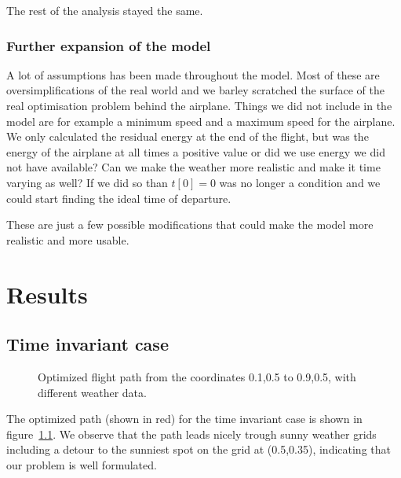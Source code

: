 \documentclass[ twoside,openright,titlepage,numbers=noenddot,headinclude,%
                footinclude=true,cleardoublepage=empty,abstractoff, %
                BCOR=5mm,paper=a4,fontsize=11pt,%
                ngerman,american,%
                ]{scrreprt}
\begin{document}
The rest of the analysis stayed the same.


\subsection{Further expansion of the model}

A lot of assumptions has been made throughout the model.
Most of these are oversimplifications of the real world and we barley scratched the surface of the real optimisation problem behind the airplane.
Things we did not include in the model are for example a minimum speed and a maximum speed for the airplane.
We only calculated the residual energy at the end of the flight, but was the energy of the airplane at all times a positive value or did we use energy we did not have available?
Can we make the weather more realistic and make it time varying as well? If we did so than $ t[0] =0 $ was no longer a condition and we could start finding the ideal time of departure.

These are just a few possible modifications that could make the model more realistic and more usable.






\chapter{Results}
\section{Time invariant case}
\begin{figure}

\caption{Optimized flight path from the coordinates 0.1,0.5 to 0.9,0.5, with different weather data.}
\label{fig:path1}
\end{figure}
The optimized path (shown in red) for the time invariant case is shown in figure~\ref{fig:path1}. We observe that the path leads nicely trough sunny weather grids including a detour to the sunniest spot on the grid at (0.5,0.35), indicating that our problem is well formulated.
\end{document}
